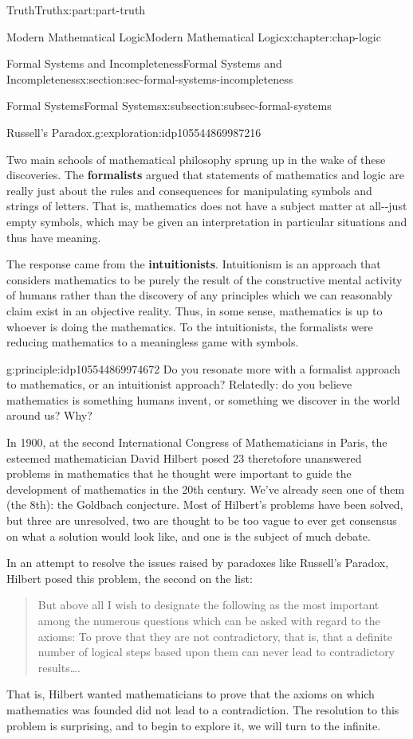 \documentclass[oneside,10pt,]{book}
\newcommand{\terminology}[1]{\textbf{#1}}
\numberwithin{equation}{section}
\begin{document}
\begin{partptx}{Truth}{}{Truth}{}{}{x:part:part-truth}
\begin{chapterptx}{Modern Mathematical Logic}{}{Modern Mathematical Logic}{}{}{x:chapter:chap-logic}
\begin{sectionptx}{Formal Systems and Incompleteness}{}{Formal Systems and Incompleteness}{}{}{x:section:sec-formal-systems-incompleteness}
\begin{subsectionptx}{Formal Systems}{}{Formal Systems}{}{}{x:subsection:subsec-formal-systems}
\begin{exploration}{Russell's Paradox.}{g:exploration:idp105544869987216}
\end{exploration}%
Two main schools of mathematical philosophy sprung up in the wake of these discoveries. The \terminology{formalists} argued that statements of mathematics and logic are really just about the rules and consequences for manipulating symbols and strings of letters. That is, mathematics does not have a subject matter at all-{}-{}just empty symbols, which may be given an interpretation in particular situations and thus have meaning.%
\par
The response came from the \terminology{intuitionists}. Intuitionism is an approach that considers mathematics to be purely the result of the constructive mental activity of humans rather than the discovery of any principles which we can reasonably claim exist in an objective reality. Thus, in some sense, mathematics is up to whoever is doing the mathematics. To the intuitionists, the formalists were reducing mathematics to a meaningless game with symbols.%
\begin{principle}{}{}{g:principle:idp105544869974672}%
Do you resonate more with a formalist approach to mathematics, or an intuitionist approach? Relatedly: do you believe mathematics is something humans invent, or something we discover in the world around us? Why?%
\end{principle}
In 1900, at the second International Congress of Mathematicians in Paris, the esteemed mathematician David Hilbert posed 23 theretofore unanswered problems in mathematics that he thought were important to guide the development of mathematics in the 20th century. We've already seen one of them (the 8th): the Goldbach conjecture. Most of Hilbert's problems have been solved, but three are unresolved, two are thought to be too vague to ever get consensus on what a solution would look like, and one is the subject of much debate.%
\par
In an attempt to resolve the issues raised by paradoxes like Russell's Paradox, Hilbert posed this problem, the second on the list:%
\begin{quote}%
But above all I wish to designate the following as the most important among the numerous questions which can be asked with regard to the axioms: To prove that they are not contradictory, that is, that a definite number of logical steps based upon them can never lead to contradictory results….\end{quote}
That is, Hilbert wanted mathematicians to prove that the axioms on which mathematics was founded did not lead to a contradiction. The resolution to this problem is surprising, and to begin to explore it, we will turn to the infinite.%

\end{subsectionptx}
\end{sectionptx}
\end{chapterptx}
\end{partptx}
\end{document}

